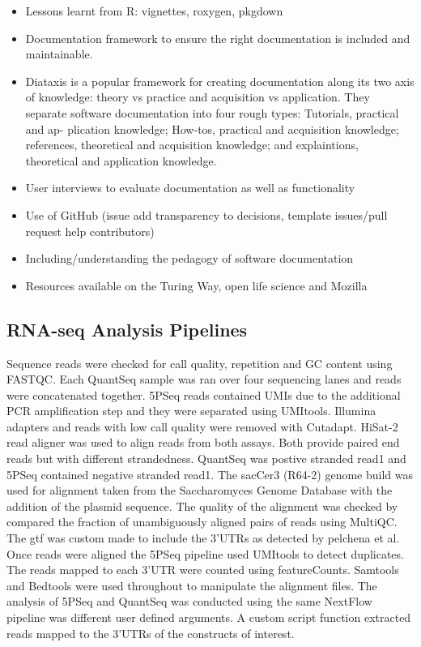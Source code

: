 \documentclass[../main.tex]{subfiles}
\begin{document}
\begin{itemize}
    \item Lessons learnt from R: vignettes, roxygen, pkgdown
    \item Documentation framework to ensure the right documentation is included and maintainable.
    \item Diataxis is a popular framework for creating documentation along its two axis of knowledge: theory vs practice and acquisition vs application. They separate software documentation into four rough types: Tutorials, practical and ap- plication knowledge; How-tos, practical and acquisition knowledge; references, theoretical and acquisition knowledge; and explaintions, theoretical and application knowledge. %
    \item User interviews to evaluate documentation as well as functionality
    \item Use of GitHub (issue add transparency to decisions, template issues/pull request help contributors)
    \item Including/understanding the pedagogy of software documentation
    \item Resources available on the Turing Way, open life science and Mozilla
\end{itemize}

\subsection{RNA-seq Analysis Pipelines}

Sequence reads were checked for call quality, repetition and GC content using FASTQC. Each QuantSeq sample was ran over four sequencing lanes and reads were concatenated together. 5PSeq reads contained UMIs due to the additional PCR amplification step and they were separated using UMItools. Illumina adapters and reads with low call quality were removed with Cutadapt. HiSat-2 read aligner was used to align reads from both assays. Both provide paired end reads but with different strandedness. QuantSeq was postive stranded read1 and 5PSeq contained negative stranded read1. The sacCer3 (R64-2) genome build was used for alignment taken from the Saccharomyces Genome Database with the addition of the plasmid sequence. The quality of the alignment was checked by compared the fraction of unambiguously aligned pairs of reads using MultiQC. The gtf was custom made to include the 3'UTRs as detected by pelchena et al. Once reads were aligned the 5PSeq pipeline used UMItools to detect duplicates. The reads mapped to each 3'UTR were counted using featureCounts. Samtools and Bedtools were used throughout to manipulate the alignment files. The analysis of 5PSeq and QuantSeq was conducted using the same NextFlow pipeline was different user defined arguments. A custom script function extracted reads mapped to the 3'UTRs of the constructs of interest.
\end{document}
